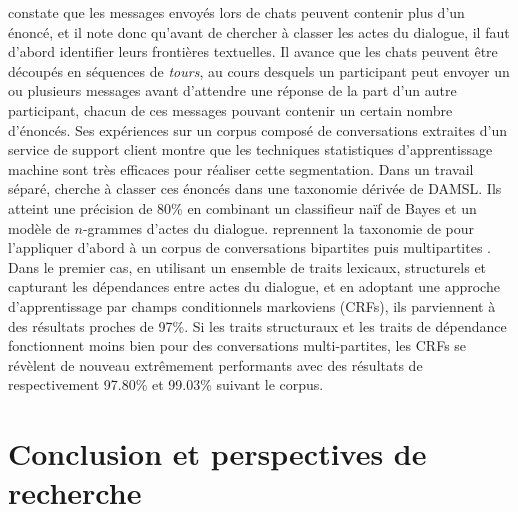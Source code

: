 \documentclass[10pt,a4paper,twoside]{article}
\begin{document}
\citet{ivanovic2005automatic} constate que les messages envoyés lors de chats peuvent contenir plus d'un énoncé, et il note donc qu'avant de chercher à classer les actes du dialogue, il faut d'abord identifier leurs frontières textuelles. Il avance que les chats peuvent être découpés en séquences de \textit{tours}, au cours desquels un participant peut envoyer un ou plusieurs messages avant d'attendre une réponse de la part d'un autre participant, chacun de ces messages pouvant contenir un certain nombre d'énoncés. Ses expériences sur un corpus composé de conversations extraites d'un service de support client montre que les techniques statistiques d'apprentissage machine sont très efficaces pour réaliser cette segmentation. Dans un travail séparé, \citet{ivanovic2005dialogue} cherche à classer ces énoncés dans une taxonomie dérivée de DAMSL. Ils atteint une précision de 80\% en combinant un classifieur naïf de Bayes et un modèle de $n$-grammes d'actes du dialogue. \citeauthor{kim2012classifying} reprennent la taxonomie de \citeauthor{ivanovic2005dialogue} pour l'appliquer d'abord à un corpus de conversations bipartites \cite{kim2010classifying} puis multipartites \cite{kim2012classifying}. Dans le premier cas, en utilisant un ensemble de traits lexicaux, structurels et capturant les dépendances entre actes du dialogue, et en adoptant une approche d'apprentissage par champs conditionnels markoviens (CRFs), ils parviennent à des résultats proches de 97\%. Si les traits structuraux et les traits de dépendance fonctionnent moins bien pour des conversations multi-partites, les CRFs se révèlent de nouveau extrêmement performants avec des résultats de respectivement 97.80\% et 99.03\% suivant le corpus.

\section{Conclusion et perspectives de recherche}
\label{sec:conclusion_and_research_perspectives}
\end{document}

